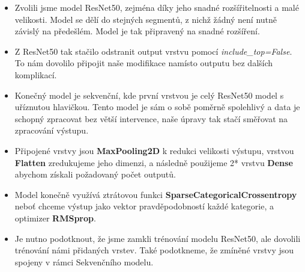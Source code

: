\documentclass[a4paper]{article}
\newenvironment{ukol}[2][]{\begin{trivlist} 
\item[\hskip \labelsep {\bfseries #1}\hskip \labelsep {\bfseries #2}]}{\end{trivlist}}
\begin{document}
\begin{ukol}{Modely}
\begin{itemize}
	\item Zvolili jsme model ResNet50, zejména díky jeho snadné rozšířitelnosti a malé velikosti. Model se dělí do stejných segmentů, z nichž žádný není nutně závislý na předešlém. Model je tak připravený na snadné rozšíření.
	\item Z ResNet50 tak stačilo odstranit output vrstvu pomocí \textit{include\_top=False}. To nám dovolilo připojit naše modifikace namísto outputu bez dalších komplikací.
	\item Konečný model je sekvenční, kde první vrstvou je celý ResNet50 model s uříznutou hlavičkou. Tento model je sám o sobě poměrně spolehlivý a data je schopný zpracovat bez větší intervence, naše úpravy tak stačí směřovat na zpracování výstupu.
	\item Připojené vrstvy jsou \textbf{MaxPooling2D} k redukci velikosti výstupu, vrstvou \textbf{Flatten} zredukujeme jeho dimenzi, a následně použijeme 2* vrstvu \textbf{Dense} abychom získali požadovaný počet outputů.
	\item Model konečně využívá ztrátovou funkci \textbf{SparseCategoricalCrossentropy} neboť chceme výstup jako vektor pravděpodobností každé kategorie, a optimizer \textbf{RMSprop}.
	\item Je nutno podotknout, že jsme zamkli trénování modelu ResNet50, ale dovolili trénování námi přidaných vrstev. Také podotkneme, že zmíněné vrstvy jsou spojeny v rámci Sekvenčního modelu.
\end{itemize}

\end{ukol}
\end{document}
